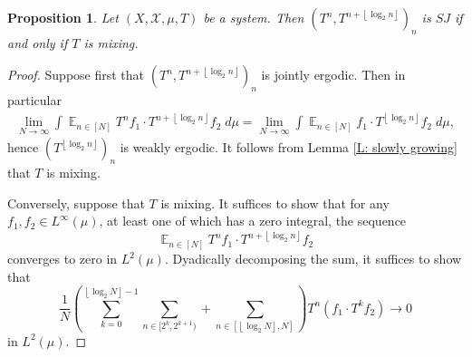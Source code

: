 \documentclass[11pt]{amsart}
\newtheorem{proposition}[lemma]{Proposition}
\theoremstyle{definition}
\DeclareMathOperator*{\E}{\mathbb{E}}
\newcommand{\1}{{\mathbf{1}}}
\newcommand{\brac}[1]{\mathopen{}\left( #1 \mathclose{}\right)}
\newcommand{\floor}[1]{{\left \lfloor #1 \right \rfloor}}
\begin{document}
\begin{proposition}\label{9.2}
    Let $(X,\mathcal{X},\mu,T)$ be a system. Then $(T^{n},T^{n+\floor{\log_{2}n}})_{n}$ is $SJ$ if and only if $T$ is mixing.
\end{proposition}
\begin{proof}
   Suppose first that $(T^n, T^{n+\floor{\log_2 n}})_n$ is jointly ergodic. Then in particular
    \begin{align*}
        \lim_{N\to\infty}\int \E_{n\in[N]}T^n f_1\cdot T^{n+\floor{\log_2 n}}f_2\; d\mu = \lim_{N\to\infty}\int \E_{n\in[N]} f_1\cdot T^{\floor{\log_2 n}}f_2\; d\mu,
    \end{align*}
    hence $(T^{\floor{\log_2 n}})_n$ is weakly ergodic. It follows from Lemma \ref{L: slowly growing} that $T$ is mixing. 
    
    Conversely, suppose that $T$ is mixing. It suffices to show that for any $f_1,f_2\in L^{\infty}(\mu)$, at least one of which has a zero integral,  the sequence \begin{equation*}
        \E_{n\in[N]} T^n f_1\cdot  T^{n+\floor{\log_2 n}}f_2 
    \end{equation*}
    converges to zero in $L^2(\mu)$.
    Dyadically decomposing the sum, it suffices to show that \begin{equation*}
        \frac{1}{N}\brac{\sum_{k=0}^{\floor{\log_2 N}-1} \sum_{n\in[2^k,2^{k+1})} + \sum_{n\in[\floor{\log_2 N}, N]}}T^n(f_1\cdot T^{k}f_2)\to 0
    \end{equation*}in $L^2(\mu)$.


\end{proof}
\end{document}
